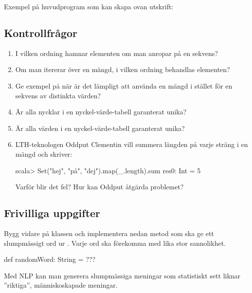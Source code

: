 \noindent Exempel på huvudprogram som kan skapa ovan utskrift:

\subsection{Kontrollfrågor}

\begin{enumerate}
\item I vilken ordning hamnar elementen om man anropar  på en sekvens?

\item Om man itererar över en mängd, i vilken ordning behandlas elementen?

\item Ge exempel på när är det lämpligt att använda en mängd i stället för en sekvens av distinkta värden?

\item Är alla nycklar i en nyckel-värde-tabell garanterat unika?

\item Är alla värden i en nyckel-värde-tabell garanterat unika?

\item LTH-teknologen Oddput Clementin vill summera längden på varje sträng i en mängd och skriver:
\begin{REPL}
scala> Set("hej", "på", "dej").map(_.length).sum
res0: Int = 5
\end{REPL}
Varför blir det fel? Hur kan Oddput åtgärda problemet?
\end{enumerate}

\subsection{Frivilliga uppgifter}

\Task Bygg vidare på klassen  och implementera nedan metod som ska ge ett slumpmässigt ord ur . Varje ord ska förekomma med lika stor sannolikhet.
\begin{Code}
def randomWord: String = ???
\end{Code}

\Task \label{task:words:randomSeq} Med NLP kan man generera slumpmässiga meningar som statistiskt sett liknar ''riktiga'', människoskapade meningar.

